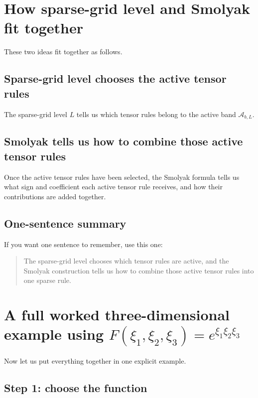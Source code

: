 \documentclass[11pt]{article}
\begin{document}
\section{How sparse-grid level and Smolyak fit together}
\label{sec:level-and-smolyak-fit}

These two ideas fit together as follows.

\subsection{Sparse-grid level chooses the active tensor rules}

The sparse-grid level \(L\) tells us which tensor rules belong to the active band
\(\mathcal A_{b,L}\).

\subsection{Smolyak tells us how to combine those active tensor rules}

Once the active tensor rules have been selected, the Smolyak formula tells us
what sign and coefficient each active tensor rule receives, and how their
contributions are added together.

\subsection{One-sentence summary}

If you want one sentence to remember, use this one:
\begin{quote}
The sparse-grid level chooses which tensor rules are active, and the Smolyak
construction tells us how to combine those active tensor rules into one sparse
rule.
\end{quote}

\section{A full worked three-dimensional example using \texorpdfstring{\(F(\xi_1,\xi_2,\xi_3)=e^{\xi_1\xi_2\xi_3}\)}{F(xi1,xi2,xi3)=exp(xi1 xi2 xi3)}}
\label{sec:full-3d-example}

Now let us put everything together in one explicit example.

\subsection{Step 1: choose the function}
\end{document}
